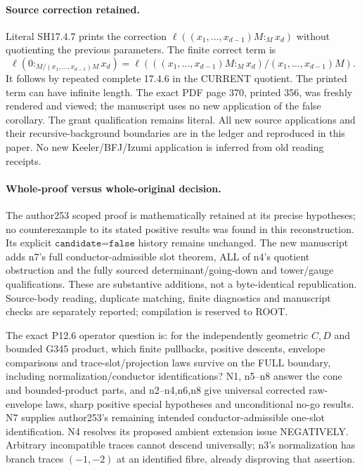 \documentclass[11pt]{article}
\begin{document}
\paragraph{Source correction retained.}
Literal SH17.4.7 prints the correction $\ell((x_1,\ldots,x_{d-1})M:_Mx_d)$ without quotienting the previous parameters. The finite correct term is
\[
 \ell(0:_{M/(x_1,\ldots,x_{d-1})M}x_d)
 =\ell\left(((x_1,\ldots,x_{d-1})M:_Mx_d)/(x_1,\ldots,x_{d-1})M\right).
\]
It follows by repeated complete 17.4.6 in the CURRENT quotient. The printed term can have infinite length. The exact PDF page 370, printed 356, was freshly rendered and viewed; the manuscript uses no new application of the false corollary. The grant qualification remains literal. All new source applications and their recursive-background boundaries are in the ledger and reproduced in this paper. No new Keeler/BFJ/Izumi application is inferred from old reading receipts.

\paragraph{Whole-proof versus whole-original decision.}
The author253 scoped proof is mathematically retained at its precise hypotheses; no counterexample to its stated positive results was found in this reconstruction. Its explicit $\texttt{candidate=false}$ history remains unchanged. The new manuscript adds n7's full conductor-admissible slot theorem, ALL of n4's quotient obstruction and the fully sourced determinant/going-down and tower/gauge qualifications. These are substantive additions, not a byte-identical republication. Source-body reading, duplicate matching, finite diagnostics and manuscript checks are separately reported; compilation is reserved to ROOT.

The exact P12.6 operator question is: for the independently geometric $C,D$ and bounded G345 product, which finite pullbacks, positive descents, envelope comparisons and trace-slot/projection laws survive on the FULL boundary, including normalization/conductor identifications? N1, n5--n8 answer the cone and bounded-product parts, and n2--n4,n6,n8 give universal corrected raw-envelope laws, sharp positive special hypotheses and unconditional no-go results. N7 supplies author253's remaining intended conductor-admissible one-slot identification. N4 resolves its proposed ambient extension issue NEGATIVELY. Arbitrary incompatible traces cannot descend universally; n3's normalization has branch traces $(-1,-2)$ at an identified fibre, already disproving that assertion.
\end{document}
